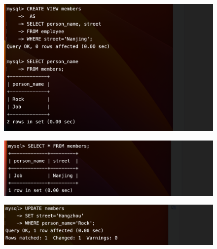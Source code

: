 \documentclass{article}
\begin{document}
\begin{figure}[H]
    \centering
    \includegraphics[width=1\textwidth]{lab2/12.png}
    \end{figure}

    \begin{figure}[H]
        \centering
        \includegraphics[width=1\textwidth]{lab2/13.png}
        \end{figure}

        \begin{figure}[H]
            \centering
            \includegraphics[width=1\textwidth]{lab2/14.png}
            \end{figure}
\end{document}
